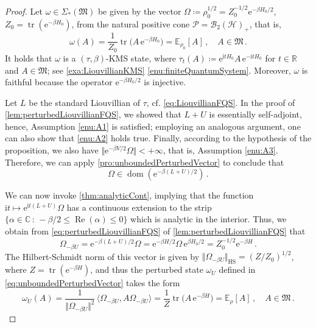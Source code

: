 \documentclass[a4paper, twoside, 11pt, reqno]{amsart}
\theoremstyle{definition}
\theoremstyle{plain}
\renewcommand{\Re}{\operatorname{Re}}
\renewcommand{\Sigma}{\varSigma}
\renewcommand{\Omega}{\varOmega}
\newcommand{\R}{\mathbb{R}}
\newcommand{\C}{\mathbb{C}}
\newcommand{\MH}{\mathcal{H}}
\newcommand{\MFM}{\mathfrak{M}}
\newcommand{\ii}{\mathrm{i}}
\newcommand{\ee}{\mathrm{e}}
\newcommand{\BO}{\mathscr{B}}
\newcommand{\HS}{\BO_2}
\newcommand{\NS}[1]{\Sigma_{\ast}(#1)}
\newcommand{\NPC}{\mathcal{P}}
\newcommand{\1}{\mathbf{1}}
\newcommand{\EV}{\mathbb{E}}
\DeclareMathOperator{\dom}{dom}
\DeclareMathOperator{\tr}{tr}
\newcommand{\set}[2][]{#1\{{#2}#1\}}
\newcommand{\norm}[2][]{#1\Vert{#2}#1\Vert}
\newcommand{\braket}[2][]{#1\langle{#2}#1\rangle}
\newcommand{\ce}{\coloneqq}
\newcommand{\com}{{\, , \quad}}
\begin{document}
\begin{proof}
    Let $\omega \in \NS{\MFM}$ be given by the vector $\Omega \ce \rho_0^{1/2} = Z_0^{-1/2} \ee^{- \beta H_0 / 2}$, $Z_0 = \tr(\ee^{- \beta H_0})$, from the natural positive cone $\NPC = \HS(\MH)_+$, that is,
    \begin{equation*}
        \omega(A) = \frac{1}{Z_0} \tr \bigl(A \, \ee^{- \beta H_0}\bigr) = \EV_{\rho_0} [A] \com A \in \MFM \, .
    \end{equation*}
    It holds that $\omega$ is a $(\tau, \beta)$-KMS state, where $\tau_t(A) \ce \ee^{\ii t H_0} A \, \ee^{- \ii t H_0}$ for $t \in \R$ and $A \in \MFM$; see \cref{exa:LiouvillianKMS} \ref{enu:finiteQuantumSystem}. Moreover, $\omega$ is faithful because the operator $\ee^{- \beta H_0 /2}$ is injective.
    
    Let $L$ be the standard Liouvillian of $\tau$, cf. \cref{eq:LiouvillianFQS}. In the proof of \cref{lem:perturbedLiouvillianFQS}, we showed that $L + U$ is essentially self-adjoint, hence, Assumption \ref{enu:A1} is satisfied; employing an analogous argument, one can also show that \ref{enu:A2} holds true. Finally, according to the hypothesis of the proposition, we also have $\norm{\ee^{- \beta V / 2} \Omega} < + \infty$, that is, Assumption \ref{enu:A3}. Therefore, we can apply \cref{pro:unboundedPerturbedVector} to conclude that
    \begin{equation*}
        \Omega \in \dom (\ee^{- \beta (L + U) / 2}) \, .
    \end{equation*}

    We can now invoke \cref{thm:analyticCont}, implying that the function $\ii t \mapsto \ee^{\ii t (L + U)} \Omega$ has a continuous extension to the strip $\set{\alpha \in \C \, : \, - \beta / 2 \le \Re(\alpha) \le 0}$ which is analytic in the interior. Thus, we obtain from \cref{eq:perturbedLiouvillianFQS} of \cref{lem:perturbedLiouvillianFQS} that
    \begin{equation*}
        \Omega_{- \beta U} = \ee^{- \beta (L + U) / 2} \Omega = \ee^{- \beta H / 2} \Omega \, \ee^{\beta H_0 / 2} = Z_0^{-1/2} \ee^{- \beta H} \, .
    \end{equation*}
    The Hilbert-Schmidt norm of this vector is given by $\norm{\Omega_{- \beta U}}_\mathrm{HS} = (Z / Z_0)^{1/2}$, where $Z = \tr (\ee^{- \beta H})$, and thus the perturbed state $\omega_U$ defined in \cref{eq:unboundedPerturbedVector} takes the form
    \begin{equation*}
        \omega_U (A) = \frac{1}{\norm{\Omega_{- \beta U}}^2} \, \braket[\big]{\Omega_{- \beta U}, A \Omega_{- \beta U}} = \frac{1}{Z} \tr \bigl(A \, \ee^{- \beta H}\bigr) = \EV_\rho [A] \com A \in \MFM \, .
    \end{equation*}


\end{proof}
\end{document}
